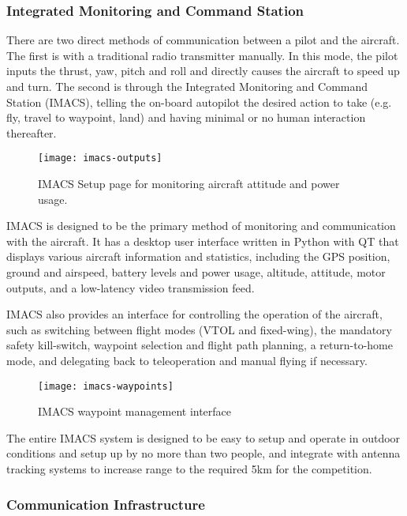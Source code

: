 \subsubsection{Integrated Monitoring and Command Station}

There are two direct methods of communication between a pilot and the aircraft.
The first is with a traditional radio transmitter manually. In this mode, the
pilot inputs the thrust, yaw, pitch and roll and directly causes the aircraft
to speed up and turn. The second is through the Integrated Monitoring and
Command Station (IMACS), telling the on-board autopilot the desired action to
take (e.g. fly, travel to waypoint, land) and having minimal or no human
interaction thereafter.

\begin{figure}[h]
	\caption{IMACS Setup page for monitoring aircraft attitude and power usage.}
	\centering
	\texttt{[image: imacs-outputs]}
\end{figure}

IMACS is designed to be the primary method of monitoring and communication with
the aircraft. It has a desktop user interface written in Python with QT that
displays various aircraft information and statistics, including the GPS position,
ground and airspeed, battery levels and power usage, altitude, attitude, motor
outputs, and a low-latency video transmission feed.

IMACS also provides an interface for controlling the operation of the aircraft,
such as switching between flight modes (VTOL and fixed-wing), the mandatory
safety kill-switch, waypoint selection and flight path planning, a return-to-home mode, and delegating back to teleoperation and manual flying if necessary.

\begin{figure}[h]
	\caption{IMACS waypoint management interface}
	\centering
	\texttt{[image: imacs-waypoints]}
\end{figure}

The entire IMACS system is designed to be easy to setup and operate in outdoor
conditions and setup up by no more than two people, and integrate with antenna
tracking systems to increase range to the required 5km for the competition.

\subsubsection{Communication Infrastructure}

